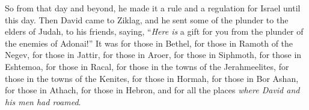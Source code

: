 \begin{biblechapter}
\verse So from that day and beyond, he made it a rule and a regulation for Israel until this day.
\verse Then David came to Ziklag, and he sent some of the plunder to the elders of Judah, to his friends, saying, “\textit{Here is} a gift for you from the plunder of the enemies of Adonai!”
\verse It was for those in Bethel, for those in Ramoth of the Negev, for those in Jattir,
\verse for those in Aroer, for those in Siphmoth, for those in Eshtemoa,
\verse for those in Racal, for those in the towns of the Jerahmeelites, for those in the towns of the Kenites,
\verse for those in Hormah, for those in Bor Ashan, for those in Athach,
\verse for those in Hebron, and for all the places \textit{where David and his men had roamed}.
\end{biblechapter}

